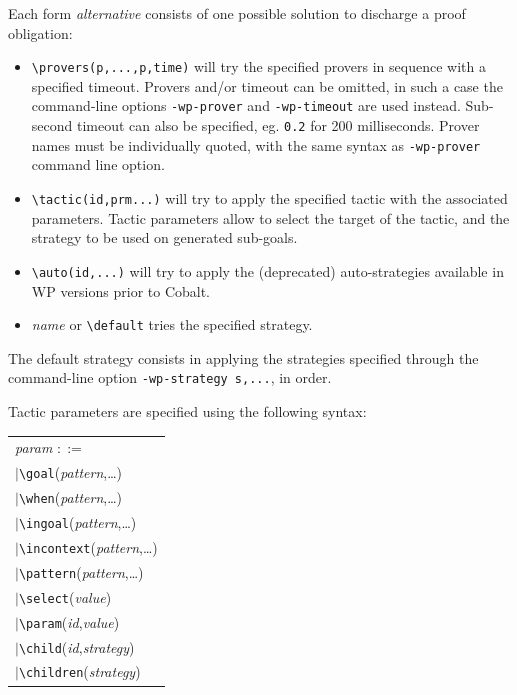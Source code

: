 Each form \emph{alternative} consists of one possible solution to discharge a proof obligation:
\begin{itemize}
\item \verb+\provers(p,...,p,time)+ will try the specified provers in sequence
  with a specified timeout. Provers and/or timeout can be omitted, in such a case the
  command-line options \verb+-wp-prover+ and \verb+-wp-timeout+ are used instead.
  Sub-second timeout can also be specified, eg. \verb+0.2+ for 200 milliseconds. Prover
  names must be individually quoted, with the same syntax as \verb+-wp-prover+
  command line option.
\item \verb+\tactic(id,prm...)+ will try to apply the specified tactic with the
  associated parameters. Tactic parameters allow to select the target of the tactic,
  and the strategy to be used on generated sub-goals.
\item \verb+\auto(id,...)+ will try to apply the (deprecated) auto-strategies
  available in \textsf{WP} versions prior to Cobalt.
\item \textit{name} or \verb$\default$ tries the specified strategy.
\end{itemize}

The default strategy consists in applying the strategies specified through the
command-line option \verb+-wp-strategy s,...+, in order.

Tactic parameters are specified using the following syntax:

\begin{center}
  \begin{tabular}{l}
    \textit{param} $::=$ \\
    \quad$|$\quad\verb+\goal+(\textit{pattern},\ldots) \\
    \quad$|$\quad\verb+\when+(\textit{pattern},\ldots) \\
    \quad$|$\quad\verb+\ingoal+(\textit{pattern},\ldots) \\
    \quad$|$\quad\verb+\incontext+(\textit{pattern},\ldots) \\
    \quad$|$\quad\verb+\pattern+(\textit{pattern},\ldots) \\
    \quad$|$\quad\verb+\select+(\textit{value}) \\
    \quad$|$\quad\verb+\param+(\textit{id},\textit{value}) \\
    \quad$|$\quad\verb+\child+(\textit{id},\textit{strategy}) \\
    \quad$|$\quad\verb+\children+(\textit{strategy}) \\
  \end{tabular}
\end{center}

